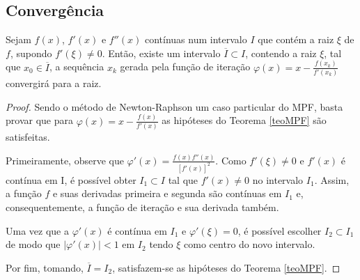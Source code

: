 \subsection{Convergência}
\begin{teo}
    Sejam $f(x)$, $f'(x)$ e $f''(x)$ contínuas num intervalo $I$ que contém a raiz $\xi$ de $f$, supondo $f'(\xi) \neq 0$. Então, existe um intervalo $\overline{I} \subset I$, contendo a raiz $\xi$, tal que $x_0 \in \overline{I}$, a sequência ${x_k}$ gerada pela função de iteração $\varphi(x) = x - \frac{f(x_k)}{f'(x_k)}$ convergirá para a raiz.
\end{teo}
\begin{proof}\label{teoNR}
    Sendo o método de Newton-Raphson um caso particular do MPF, basta provar que para $\varphi(x) = x - \frac{f(x)}{f'(x)}$ as hipóteses do Teorema \ref{teoMPF} são satisfeitas. 
    
    Primeiramente, observe que $\varphi'(x) = \frac{f(x)f''(x)}{[f'(x)]^2}$. Como $f'(\xi) \neq 0$ e $f'(x)$ é contínua em I, é possível obter $I_1 \subset I$ tal que $f'(x) \neq 0$ no intervalo $I_1$. Assim, a função $f$ e suas derivadas primeira e segunda são contínuas em $I_1$ e, consequentemente, a função de iteração e sua derivada também.
    
     Uma vez que a $\varphi'(x)$ é contínua em $I_1$ e $\varphi'(\xi) = 0$, é possível escolher $I_2 \subset I_1$ de modo que $|\varphi'(x)| < 1$ em $I_2$ tendo $\xi$ como centro do novo intervalo.

    Por fim, tomando, $\overline{I} = I_2$, satisfazem-se as hipóteses do Teorema \ref{teoMPF}.
\end{proof}
